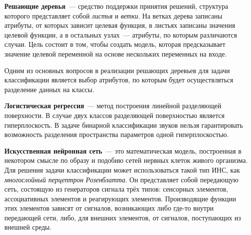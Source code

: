 	\textbf{Решающие деревья}~--- средство поддержки принятия решений, структура которого представляет собой \textit{листья} и \textit{ветки}.
    На ветках дерева записаны атрибуты, от которых зависит целевая функция, в листьях записаны значения целевой функции,
    а в остальных узлах~--- атрибуты, по которым различаются случаи. Цель состоит в том, чтобы создать модель,
    которая предсказывает значение целевой переменной на основе нескольких переменных на входе.

    Одним из основных вопросов в реализации решающих деревьев для задачи классификации является выбор атрибутов,
    по которым будет осуществляться разделение данных на классы.

    \textbf{Логистическая регрессия}~--- метод построения линейной разделяющей поверхности.
    В случае двух классов разделяющей поверхностью является гиперплоскость.
    В задаче бинарной классификации звуков нельзя гарантировать возможность разделения пространства параметров
    одной гиперплоскостью.

    \textbf{Искусственная нейронная сеть}~--- это математическая модель, построенная в некотором смысле по образу
    и подобию сетей нервных клеток живого организма. Для решения задачи классификации может использоваться
    такой тип ИНС, как \textit{многослойный перцептрон Розенблатта}.
    Он представляет собой передающую сеть, состоящую из генераторов сигнала трёх типов: сенсорных элементов,
    ассоциативных элементов и реагирующих элементов. Производящие функции этих элементов зависят от сигналов, возникающих либо где-то внутри передающей сети,
    либо, для внешних элементов, от сигналов, поступающих из внешней среды.
